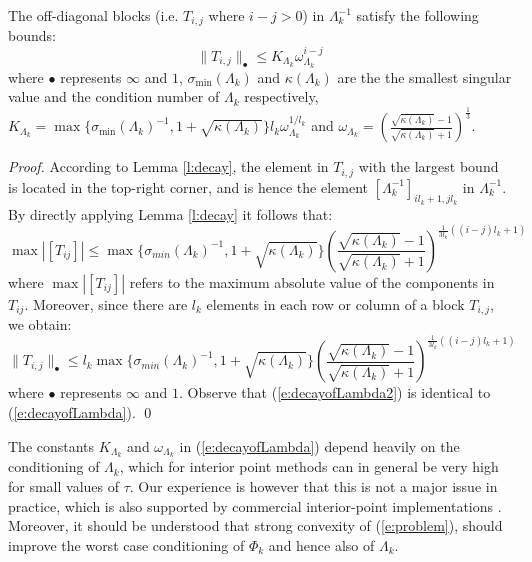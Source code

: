 \begin{proposition} \label{p:decayofLambda}
The off-diagonal blocks (i.e. $T_{i,j}$ where $i - j > 0$) in $\Lambda_k^{-1}$ satisfy the following bounds:
\begin{equation} \label{e:decayofLambda}
\| T_{i,j} \|_\bullet \leq K_{\Lambda_k} \omega_{\Lambda_k}^{i - j}
\end{equation}
where $\bullet$ represents $\infty$ and $1$, $\sigma_{\min}(\Lambda_k)$ and $\kappa(\Lambda_k)$ are the the smallest singular value and the condition number of $\Lambda_k$ respectively, $K_{\Lambda_k} = \max \{ \sigma_{\min}(\Lambda_k)^{-1}, 1 + \sqrt{\kappa(\Lambda_k)} \} l_k \omega_{\Lambda_k}^{1/l_k}$ and $\omega_{\Lambda_k} = \left( \frac{\sqrt{\kappa(\Lambda_k)} - 1}{\sqrt{\kappa(\Lambda_k)} + 1} \right)^{\frac{1}{3}}$.
\end{proposition}
\begin{proof}
According to Lemma \ref{l:decay}, the element in $T_{i,j}$ with the largest bound is located in the top-right corner, and is hence the element $[\Lambda_k^{-1}]_{i l_k + 1, j l_k}$ in $\Lambda_k^{-1}$. By directly applying Lemma \ref{l:decay} it follows that:
\begin{equation}
\max \left| [ T_{ij} ] \right| \leq \max \{ \sigma_{min}(\Lambda_k)^{-1}, 1 +  \sqrt{\kappa(\Lambda_k)} \} \left( \frac{ \sqrt{\kappa(\Lambda_k)} - 1}{ \sqrt{\kappa(\Lambda_k)} + 1} \right)^{\frac{1}{3l_k}((i - j)l_k + 1)}
\end{equation}
where $\max \left| [ T_{ij} ] \right| $ refers to the maximum absolute value of the components in $T_{ij}$. Moreover, since there are $l_k$ elements in each row or column of a block $T_{i,j}$, we obtain:
\begin{equation} \label{e:decayofLambda2}
\| T_{i,j} \|_\bullet \leq l_k \max \{ \sigma_{min}(\Lambda_k)^{-1}, 1 +  \sqrt{\kappa(\Lambda_k)} \} \left( \frac{ \sqrt{\kappa(\Lambda_k)} - 1}{ \sqrt{\kappa(\Lambda_k)} + 1} \right)^{\frac{1}{3l_k}((i - j)l_k + 1)}
\end{equation}
where $\bullet$ represents $\infty$ and $1$. Observe that (\ref{e:decayofLambda2}) is identical to (\ref{e:decayofLambda}).
\qed
\end{proof}
\begin{remark}
The constants $K_{\Lambda_k}$ and $\omega_{\Lambda_k}$ in (\ref{e:decayofLambda}) depend heavily on the conditioning of $\Lambda_k$, which for interior point methods can in general be very high for small values of $\tau$. Our experience is however that this is not a major issue in practice, which is also supported by commercial interior-point implementations \cite{WrightM1998} \cite{Domahidi2012}. Moreover, it should be understood that strong convexity of (\ref{e:problem}), should improve the worst case conditioning of $\Phi_k$ and hence also of $\Lambda_k$.
\end{remark}

